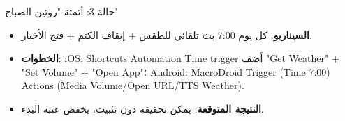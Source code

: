 \begin{tcbinfo}{حالة 3: أتمتة "روتين الصباح"}
\begin{itemize}
  \item \textbf{السيناريو}: كل يوم 7:00 بث تلقائي للطقس + إيقاف الكتم + فتح الأخبار.
  \item \textbf{الخطوات}: iOS: Shortcuts Automation Time trigger أضف "Get Weather" + "Set Volume" + "Open App"؛ Android: MacroDroid Trigger (Time 7:00) Actions (Media Volume/Open URL/TTS Weather).
  \item \textbf{النتيجة المتوقعة}: يمكن تحقيقه دون تثبيت، يخفض عتبة البدء.
\end{itemize}

\end{tcbinfo}
